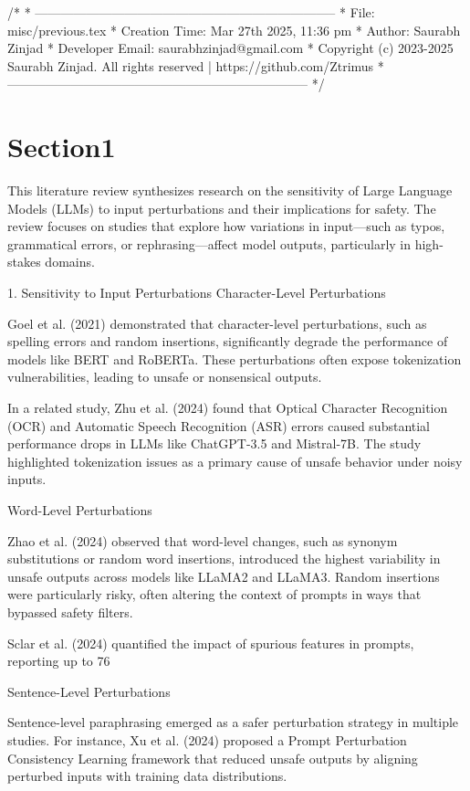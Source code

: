 /*
 * -----------------------------------------------------------------------
 * File: misc/previous.tex
 * Creation Time: Mar 27th 2025, 11:36 pm
 * Author: Saurabh Zinjad
 * Developer Email: saurabhzinjad@gmail.com
 * Copyright (c) 2023-2025 Saurabh Zinjad. All rights reserved | https://github.com/Ztrimus
 * -----------------------------------------------------------------------
 */

  \section{Section1}
  This literature review synthesizes research on the sensitivity of Large Language Models (LLMs) to input perturbations and their implications for safety. The review focuses on studies that explore how variations in input—such as typos, grammatical errors, or rephrasing—affect model outputs, particularly in high-stakes domains.

1. Sensitivity to Input Perturbations
Character-Level Perturbations

Goel et al. (2021) demonstrated that character-level perturbations, such as spelling errors and random insertions, significantly degrade the performance of models like BERT and RoBERTa. These perturbations often expose tokenization vulnerabilities, leading to unsafe or nonsensical outputs.

In a related study, Zhu et al. (2024) found that Optical Character Recognition (OCR) and Automatic Speech Recognition (ASR) errors caused substantial performance drops in LLMs like ChatGPT-3.5 and Mistral-7B. The study highlighted tokenization issues as a primary cause of unsafe behavior under noisy inputs.

Word-Level Perturbations

Zhao et al. (2024) observed that word-level changes, such as synonym substitutions or random word insertions, introduced the highest variability in unsafe outputs across models like LLaMA2 and LLaMA3. Random insertions were particularly risky, often altering the context of prompts in ways that bypassed safety filters.

Sclar et al. (2024) quantified the impact of spurious features in prompts, reporting up to 76%

Sentence-Level Perturbations

Sentence-level paraphrasing emerged as a safer perturbation strategy in multiple studies. For instance, Xu et al. (2024) proposed a Prompt Perturbation Consistency Learning framework that reduced unsafe outputs by aligning perturbed inputs with training data distributions.

